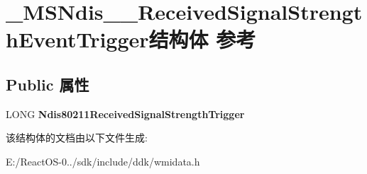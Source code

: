 \hypertarget{struct___m_s_ndis__80211___received_signal_strength_event_trigger}{}\section{\+\_\+\+M\+S\+Ndis\+\_\+\_\+\+Received\+Signal\+Strength\+Event\+Trigger结构体 参考}
\label{struct___m_s_ndis__80211___received_signal_strength_event_trigger}
\subsection*{Public 属性}
\begin{DoxyCompactItemize}
\item 
\mbox{\label{struct___m_s_ndis__80211___received_signal_strength_event_trigger_a5a7253525e32df9f3eaa698f3ac76ba9}} 
L\+O\+NG {\bfseries Ndis80211\+Received\+Signal\+Strength\+Trigger}
\end{DoxyCompactItemize}


该结构体的文档由以下文件生成\+:\begin{DoxyCompactItemize}
\item 
E\+:/\+React\+O\+S-\/0../sdk/include/ddk/wmidata.\+h\end{DoxyCompactItemize}
